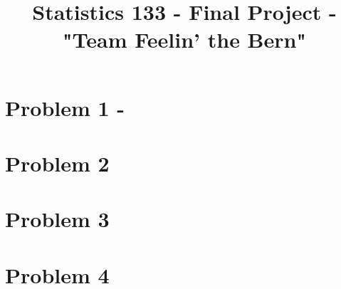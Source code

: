 \documentclass[11pt]{article}
\title{Statistics 133 - Final Project - "Team Feelin' the Bern"}
\author{\Name}
\date{}
\begin{document}
\maketitle

\section*{Problem 1 - }


\newpage
\section*{Problem 2}

\newpage
\section*{Problem 3}

\newpage
\section*{Problem 4}
\end{document}
